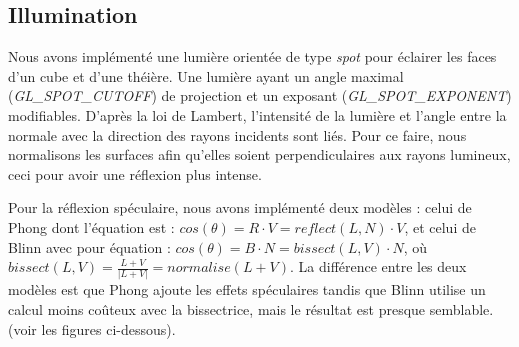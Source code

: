 \documentclass[10pt,a4paper]{article}
\begin{document}
\subsection{Illumination}

Nous avons implémenté une lumière orientée de type \textit{spot} pour éclairer les faces d'un cube et d'une théière.  Une lumière ayant un angle maximal (\textit{GL\_SPOT\_CUTOFF}) de projection et un exposant (\textit{GL\_SPOT\_EXPONENT}) modifiables. D'après la loi de Lambert, l'intensité de la lumière et l'angle entre la normale avec la direction des rayons incidents sont liés. Pour ce faire, nous normalisons les surfaces afin qu'elles soient perpendiculaires aux rayons lumineux, ceci pour avoir une réflexion plus intense.

Pour la réflexion spéculaire,  nous avons implémenté deux modèles : celui de Phong dont l'équation est : 
$ cos(\theta) = R \cdot V = reflect (L,N) \cdot V $, et celui de Blinn avec pour équation : $ cos(\theta) = B \cdot N = bissect(L,V) \cdot N $, où $ bissect (L,V) = \frac{L+V}{|L+V|} = normalise(L+V) $. La différence entre les deux modèles est que Phong ajoute les effets spéculaires tandis que Blinn utilise un calcul moins coûteux avec la bissectrice, mais le résultat est presque semblable. (voir les figures ci-dessous).
\end{document}
